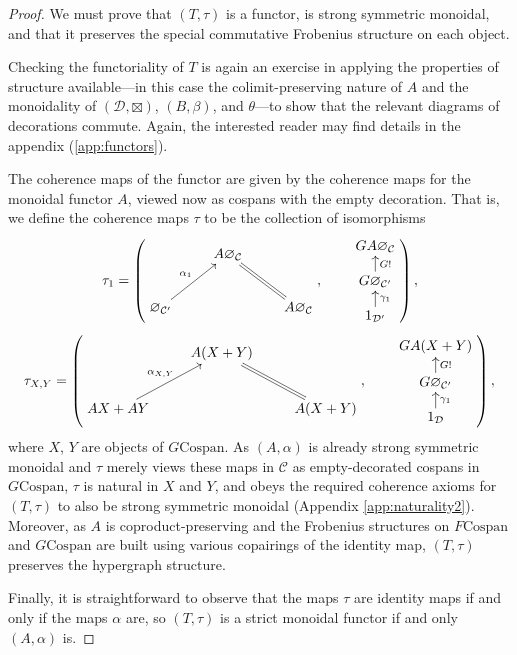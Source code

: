 \begin{proof}
  We must prove that $(T,\tau)$ is a functor, is strong symmetric monoidal, and
  that it preserves the special commutative Frobenius structure on each object.

  Checking the functoriality of $T$ is again an exercise in applying the
  properties of structure available---in this case the colimit-preserving nature
  of $A$ and the monoidality of $(\mathcal D,\boxtimes)$, $(B,\beta)$, and
  $\theta$---to show that the relevant diagrams of decorations commute. Again,
  the interested reader may find details in the appendix (\ref{app:functors}).
  
  The coherence maps of the functor are given by the coherence maps for the
  monoidal functor $A$, viewed now as cospans with the empty decoration. That
  is, we define the coherence maps $\tau$ to be the collection of isomorphisms
  \[
    \tau_1 = 
    \left(
    \begin{aligned}
      \xymatrix{
	& A\varnothing_{\mathcal C} \\  
	\varnothing_{\mathcal C'} \ar[ur]^{\alpha_1} && A\varnothing_{\mathcal
	C} \ar@{=}[ul]
      }
    \end{aligned}
    ,
    \qquad
    \begin{aligned}
      \xymatrixrowsep{.9pc}
      \xymatrix{
	GA\varnothing_{\mathcal C} \\
	G\varnothing_{\mathcal C'} \ar[u]_{G!} \\
	1_{\mathcal D'} \ar[u]_{\gamma_1}
      }
    \end{aligned}
    \right),
  \]
  \[
    \tau_{X,Y}=
    \left(
    \begin{aligned}
      \xymatrix{
	& A(X+Y) \\  
	AX+AY \ar[ur]^{\alpha_{X,Y}} && A(X+Y) \ar@{=}[ul]
      }
    \end{aligned}
    ,
    \qquad
    \begin{aligned}
      \xymatrixrowsep{.9pc}
      \xymatrix{
	GA(X+Y) \\
	G\varnothing_{\mathcal C'} \ar[u]_{G!} \\
	1_{\mathcal D} \ar[u]_{\gamma_1}
      }
    \end{aligned}
    \right),
  \]
  where $X$, $Y$ are objects of $G\mathrm{Cospan}$. As $(A,\alpha)$ is already
  strong symmetric monoidal and $\tau$ merely views these maps in $\mathcal C$
  as empty-decorated cospans in $G\mathrm{Cospan}$, $\tau$ is natural in $X$ and
  $Y$, and obeys the required coherence axioms for $(T,\tau)$ to also be strong
  symmetric monoidal (Appendix \ref{app:naturality2}). Moreover, as $A$ is
  coproduct-preserving and the Frobenius structures on $F\mathrm{Cospan}$ and
  $G\mathrm{Cospan}$ are built using various copairings of the identity map,
  $(T,\tau)$ preserves the hypergraph structure.

  Finally, it is straightforward to observe that the maps $\tau$ are identity
  maps if and only if the maps $\alpha$ are, so $(T,\tau)$ is a strict monoidal
  functor if and only $(A,\alpha)$ is.
\end{proof}

